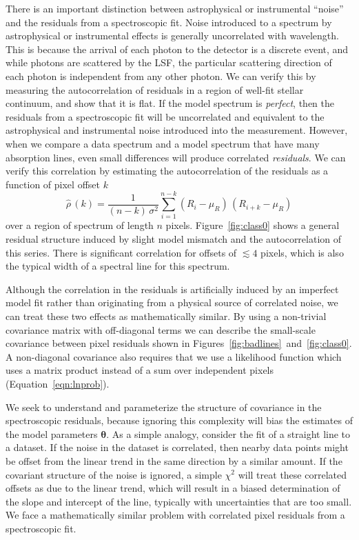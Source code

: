 \documentclass[preprint]{aastex} %
\newcommand{\vt}{ {\bm \theta}}
\begin{document}
There is an important distinction between astrophysical or instrumental ``noise'' and the residuals from a spectroscopic fit. Noise introduced to a spectrum by astrophysical or instrumental effects is generally uncorrelated with wavelength. This is because the arrival of each photon to the detector is a discrete event, and while photons are scattered by the LSF, the particular scattering direction of each photon is independent from any other photon. We can verify this by measuring the autocorrelation of residuals in a region of well-fit stellar continuum, and show that it is flat. If the model spectrum is \emph{perfect}, then the residuals from a spectroscopic fit will be uncorrelated and equivalent to the astrophysical and instrumental noise introduced into the measurement. However, when we compare a data spectrum and a model spectrum that have many absorption lines, even small differences will produce correlated \emph{residuals}. We can verify this correlation by estimating the autocorrelation of the residuals as a function of pixel offset $k$
\begin{equation}
  \hat{\rho}\,(k) = \frac{1}{(n - k)\,\sigma^2} \sum_{i = 1}^{n - k} (R_i - \mu_R)\,(R_{i+k} - \mu_R)
  \label{eqn:autocorrelation}
\end{equation}
over a region of spectrum of length $n$ pixels. Figure~\ref{fig:class0} shows a general residual structure induced by slight model mismatch and the autocorrelation of this series. There is significant correlation for offsets of $\lesssim 4$ pixels, which is also the typical width of a spectral line for this spectrum.

Although the correlation in the residuals is artificially induced by an
imperfect model fit rather than originating from a physical source of
correlated noise, we can treat these two effects as mathematically similar. By
using a non-trivial covariance matrix with off-diagonal terms we can describe
the small-scale covariance between pixel residuals shown in
Figures~\ref{fig:badlines}~and~\ref{fig:class0}. A non-diagonal covariance also
requires that we use  a likelihood function  which uses a matrix product instead of a sum over independent pixels (Equation~\ref{eqn:lnprob}).

We seek to understand and parameterize the structure of covariance in the
spectroscopic residuals, because ignoring this complexity will bias the estimates of
the model parameters $\vt$. As a simple analogy, consider the fit of a straight
line to a dataset.  If the noise in the dataset is correlated, then nearby
data points might be offset from the linear trend in the same direction by a
similar amount.  If the covariant structure of the noise is ignored, a simple
$\chi^2$ will treat these correlated offsets as due to the linear trend, which
will result in a biased determination of the slope and intercept of the line,
typically with uncertainties that are too small. We face a mathematically similar problem with 
correlated pixel residuals from a spectroscopic fit.
\end{document}
